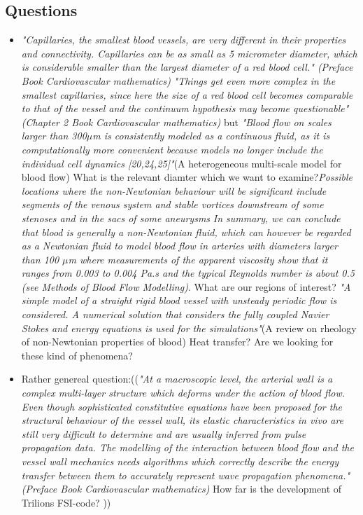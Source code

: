 \documentclass[11pt,letterpaper]{article}
\begin{document}
\newpage
\subsection*{Questions}
\begin{itemize}
    \item  \textit{"Capillaries, the smallest blood vessels, are very different in their properties and connectivity. Capillaries can be as small as 5 micrometer diameter, which is considerable smaller than the largest diameter of a red blood cell." (Preface Book Cardiovascular mathematics)} \newline
    \textit{"Things get even more complex in the smallest capillaries, since here the size of a red blood cell becomes comparable to that of the vessel and the continuum hypothesis may become questionable" (Chapter 2 Book Cardiovascular mathematics)}\newline
    but \textit{"Blood flow on scales larger than 300$\mu$m is consistently modeled as a continuous fluid, as it is computationally more convenient because models no longer include the individual cell dynamics [20,24,25]"}(A heterogeneous multi-scale model for blood flow)
\newline
{\color{red}What is the relevant diamter which we want to examine?}\newline \textit{Possible locations where the non-Newtonian behaviour will be significant include segments of the venous system and stable vortices downstream of some stenoses and in the sacs of some aneurysms} \textit{In summary, we can conclude that blood is generally a non-Newtonian fluid, which can however be
regarded as a Newtonian fluid to model blood flow in arteries with diameters larger than 100 $\mu$m where measurements of the apparent viscosity show that it ranges from 0.003 to 0.004 Pa.s and the typical Reynolds number is about 0.5 (see Methods of Blood Flow Modelling)}.\newline
{\color{red} What are our regions of interest?} \newline \textit{"A simple model of a straight rigid blood vessel with unsteady periodic flow is considered. A numerical solution that considers the fully coupled Navier Stokes and energy equations is used for the simulations"}(A review on rheology of non-Newtonian properties of blood) \newline
{\color{red}Heat transfer?}
{\color{red} Are we looking for these kind of phenomena?}
    \item Rather genereal question:((\textit{"At a macroscopic level, the arterial wall is a complex multi-layer structure which deforms under the action of blood flow. Even though sophisticated constitutive equations have been proposed for the structural behaviour of the vessel wall, its elastic characteristics in vivo are still very difficult to determine and are usually inferred from pulse propagation data. The modelling of the interaction between blood flow and the vessel wall mechanics needs algorithms which correctly describe the energy transfer between them to accurately represent wave propagation phenomena." (Preface Book Cardiovascular mathematics)} \newline
    {\color{red}How far is the development of Trilions FSI-code?} ))
\end{itemize}
\end{document}
